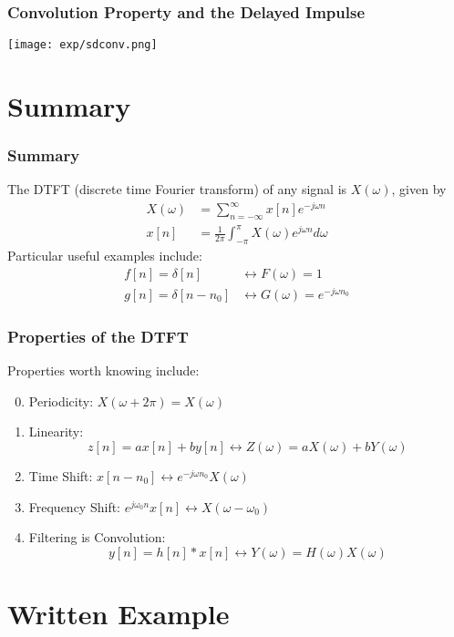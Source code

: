 \documentclass{beamer}
\begin{document}
\begin{frame}
  \frametitle{Convolution Property and the Delayed Impulse}

  \centerline{\texttt{[image: exp/sdconv.png]}}
\end{frame}

\section[Summary]{Summary}
\setcounter{subsection}{1}

\begin{frame}
  \frametitle{Summary}

  The DTFT (discrete time Fourier transform) of any signal is
  $X(\omega)$, given by
  \begin{align*}
    X(\omega) &= \sum_{n=-\infty}^\infty x[n]e^{-j\omega n}\\
    x[n] &= \frac{1}{2\pi}\int_{-\pi}^\pi X(\omega)e^{j\omega n}d\omega
  \end{align*}
  Particular useful examples include:
  \begin{align*}
    f[n]=\delta[n] &\leftrightarrow F(\omega)=1\\
    g[n]=\delta[n-n_0] &\leftrightarrow G(\omega)=e^{-j\omega n_0}
  \end{align*}
\end{frame}

\begin{frame}
  \frametitle{Properties of the DTFT}

  Properties worth knowing  include:
  \begin{enumerate}
    \setcounter{enumi}{-1}
  \item Periodicity: $X(\omega+2\pi)=X(\omega)$
  \item Linearity:
    \[z[n]=ax[n]+by[n]\leftrightarrow Z(\omega)=aX(\omega)+bY(\omega)
    \]
  \item Time Shift: $x[n-n_0]\leftrightarrow e^{-j\omega n_0}X(\omega)$
  \item Frequency Shift: $e^{j\omega_0 n}x[n]\leftrightarrow X(\omega-\omega_0)$
  \item Filtering is Convolution:
    \[
    y[n]=h[n]\ast x[n]\leftrightarrow Y(\omega)=H(\omega)X(\omega)
    \]
  \end{enumerate}
\end{frame}

\section[Example]{Written Example}
\setcounter{subsection}{1}
\end{document}
